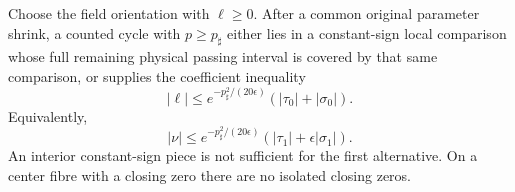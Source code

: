 \begin{proposition}
\label{rw:outer-forcing}
Choose the field orientation with $\ell\ge0$.
After a common original parameter shrink, a counted cycle with
$p\ge p_\sharp$ either lies in a constant-sign local comparison
whose full remaining physical passing interval is covered by that
same comparison, or supplies the coefficient inequality
\begin{equation}\label{rw:fibre:original-forcing}
 |\ell|\le e^{-p_\sharp^2/(20\epsilon)}
                    (|\tau_0|+|\sigma_0|).
\end{equation}
Equivalently,
\begin{equation}\label{rw:fibre:normalized-forcing}
 |\nu|\le e^{-p_\sharp^2/(20\epsilon)}
                    (|\tau_1|+\epsilon|\sigma_1|).
\end{equation}
An interior constant-sign piece is not sufficient for the first
alternative. On a center fibre with a closing zero there are no
isolated closing zeros.
\end{proposition}
